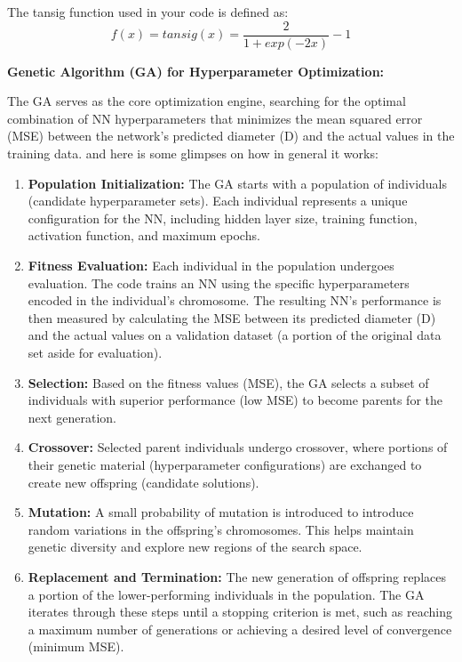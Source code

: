 \documentclass[
  super,
  review,
  3p]{elsarticle}
\providecommand{\tightlist}{%
  \setlength{\itemsep}{0pt}\setlength{\parskip}{0pt}}\usepackage{longtable,booktabs,array}
\begin{document}
The tansig function used in your code is defined as: \[
f(x) = tansig(x) = \frac{2}{1 + exp(-2x)} - 1
\]

\textbf{Genetic Algorithm (GA) for Hyperparameter Optimization:}

The GA serves as the core optimization engine, searching for the optimal
combination of NN hyperparameters that minimizes the mean squared error
(MSE) between the network's predicted diameter (D) and the actual values
in the training data. and here is some glimpses on how in general it
works:

\begin{enumerate}
\def\labelenumi{\arabic{enumi}.}
\tightlist
\item
  \textbf{Population Initialization:} The GA starts with a population of
  individuals (candidate hyperparameter sets). Each individual
  represents a unique configuration for the NN, including hidden layer
  size, training function, activation function, and maximum epochs.
\item
  \textbf{Fitness Evaluation:} Each individual in the population
  undergoes evaluation. The code trains an NN using the specific
  hyperparameters encoded in the individual's chromosome. The resulting
  NN's performance is then measured by calculating the MSE between its
  predicted diameter (D) and the actual values on a validation dataset
  (a portion of the original data set aside for evaluation).
\item
  \textbf{Selection:} Based on the fitness values (MSE), the GA selects
  a subset of individuals with superior performance (low MSE) to become
  parents for the next generation.
\item
  \textbf{Crossover:} Selected parent individuals undergo crossover,
  where portions of their genetic material (hyperparameter
  configurations) are exchanged to create new offspring (candidate
  solutions).
\item
  \textbf{Mutation:} A small probability of mutation is introduced to
  introduce random variations in the offspring's chromosomes. This helps
  maintain genetic diversity and explore new regions of the search
  space.
\item
  \textbf{Replacement and Termination:} The new generation of offspring
  replaces a portion of the lower-performing individuals in the
  population. The GA iterates through these steps until a stopping
  criterion is met, such as reaching a maximum number of generations or
  achieving a desired level of convergence (minimum MSE).
\end{enumerate}
\end{document}
